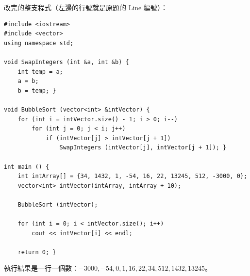 \begin{pastsoln}
改完的整支程式（左邊的行號就是原題的 Line 編號）：
\begin{verbatim}
#include <iostream>
#include <vector>
using namespace std;

void SwapIntegers (int &a, int &b) {
    int temp = a;
    a = b;
    b = temp; }

void BubbleSort (vector<int> &intVector) {
    for (int i = intVector.size() - 1; i > 0; i--)
        for (int j = 0; j < i; j++)
            if (intVector[j] > intVector[j + 1])
                SwapIntegers (intVector[j], intVector[j + 1]); }

int main () {
    int intArray[] = {34, 1432, 1, -54, 16, 22, 13245, 512, -3000, 0};
    vector<int> intVector(intArray, intArray + 10);

    BubbleSort (intVector);

    for (int i = 0; i < intVector.size(); i++)
        cout << intVector[i] << endl;

    return 0; }
\end{verbatim}
執行結果是一行一個數：$-3000, -54, 0, 1, 16, 22, 34, 512, 1432, 13245$。
\end{pastsoln}

